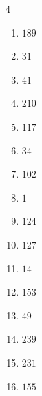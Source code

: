 \begin{multicols}{4}
\begin{enumerate}
  \item $189$


  \item $31$


\columnbreak %

  \item $41$


  \item $210$


  \item $117$


  \item $34$


  \item $102$


  \item $1$


  \item $124$


  \item $127$


  \item $14$


  \item $153$


  \item $49$


  \item $239$


  \item $231$


  \item $155$


\end{enumerate}
\end{multicols}
